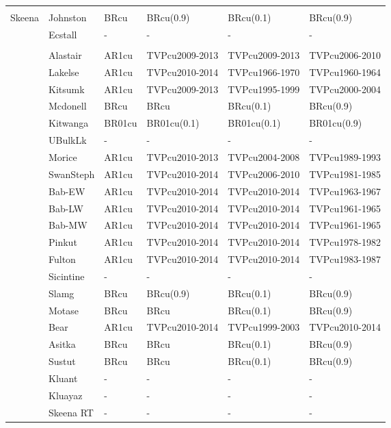 \documentclass[french,11pt]{book}
\begin{document}
\begin{longtable}[t]{llllll}
\midrule\\ Skeena & Johnston & BRcu & BRcu(0.9) & BRcu(0.1) & BRcu(0.9)\\  & Ecstall & - & - & - & -\\
\midrule\\  & Alastair & AR1cu & TVPcu2009-2013 & TVPcu2009-2013 & TVPcu2006-2010\\  & Lakelse & AR1cu & TVPcu2010-2014 & TVPcu1966-1970 & TVPcu1960-1964\\  & Kitsumk & AR1cu & TVPcu2009-2013 & TVPcu1995-1999 & TVPcu2000-2004\\  & Mcdonell & BRcu & BRcu & BRcu(0.1) & BRcu(0.9)\\  & Kitwanga & BR01cu & BR01cu(0.1) & BR01cu(0.1) & BR01cu(0.9)\\  & UBulkLk & - & - & - & -\\  & Morice & AR1cu & TVPcu2010-2013 & TVPcu2004-2008 & TVPcu1989-1993\\  & SwanSteph & AR1cu & TVPcu2010-2014 & TVPcu2006-2010 & TVPcu1981-1985\\  & Bab-EW & AR1cu & TVPcu2010-2014 & TVPcu2010-2014 & TVPcu1963-1967\\  & Bab-LW & AR1cu & TVPcu2010-2014 & TVPcu2010-2014 & TVPcu1961-1965\\  & Bab-MW & AR1cu & TVPcu2010-2014 & TVPcu2010-2014 & TVPcu1961-1965\\  & Pinkut & AR1cu & TVPcu2010-2014 & TVPcu2010-2014 & TVPcu1978-1982\\  & Fulton & AR1cu & TVPcu2010-2014 & TVPcu2010-2014 & TVPcu1983-1987\\  & Sicintine & - & - & - & -\\  & Slamg & BRcu & BRcu(0.9) & BRcu(0.1) & BRcu(0.9)\\  & Motase & BRcu & BRcu & BRcu(0.1) & BRcu(0.9)\\  & Bear & AR1cu & TVPcu2010-2014 & TVPcu1999-2003 & TVPcu2010-2014\\  & Asitka & BRcu & BRcu & BRcu(0.1) & BRcu(0.9)\\  & Sustut & BRcu & BRcu & BRcu(0.1) & BRcu(0.9)\\  & Kluant & - & - & - & -\\  & Kluayaz & - & - & - & -\\  & Skeena RT & - & - & - & -\\* \end{longtable}

\endgroup{} \endgroup{}

\clearpage
\end{document}
